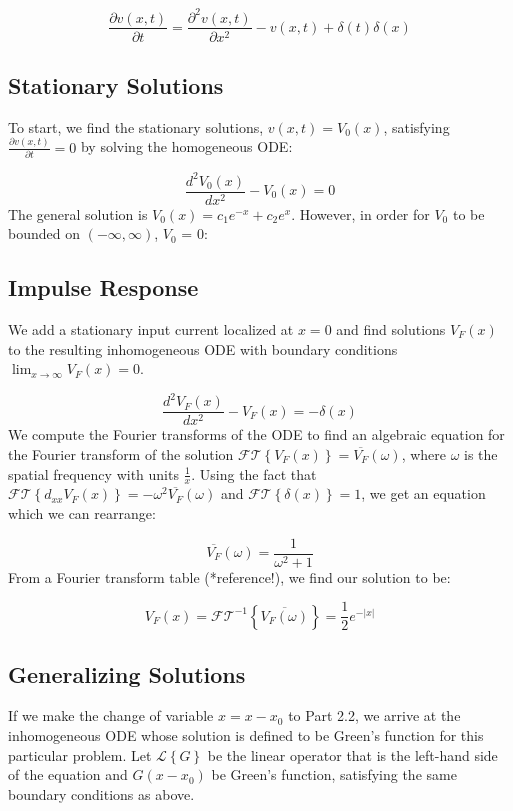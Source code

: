 \documentclass[12pt]{article}
\begin{document}
\begin{equation} \label{pm}
\frac{\partial{v(x,t)}}{\partial{t}}=\frac{\partial^2{v(x,t)}}{\partial{x}^2}-v(x,t)+\delta(t)\delta(x)
\end {equation}

\subsection{Stationary Solutions}
To start, we find the stationary solutions, $v(x,t) = V_0(x)$, satisfying $\frac{\partial{v(x,t)}}{\partial{t}} = 0$ by solving the homogeneous ODE:

\begin{equation} \label{pm_odeH}
\frac{d^2{V_0(x)}}{d{x^2}} - V_0(x) = 0
\end{equation}
The general solution is $V_0(x) = c_1e^{-x} + c_2e^{x}$. However, in order for $V_0$ to be bounded on $(-\infty, \infty)$, $V_0$ = 0:

\subsection{Impulse Response}
We add a stationary input current localized at $x=0$ and find solutions $V_F(x)$ to the resulting inhomogeneous ODE with boundary conditions $\lim_{x\to\infty} V_F(x) = 0$.

\begin{equation} \label{pm_odeN}
\frac{d^2{V_F(x)}}{d{x^2}} - V_F(x) = -\delta(x)
\end{equation}
We compute the Fourier transforms of the ODE to find an algebraic equation for the Fourier transform of the solution $\mathcal{FT}\left\{V_F(x)\right\} = \overline{V_F}(\omega)$, where $\omega$ is the spatial frequency with units $\frac{1}{x}$. Using the fact that $\mathcal{FT}\left\{d_{xx}V_F(x)\right\} = -\omega^2\overline{V_F}(\omega)$ and $ \mathcal{FT}\left\{\delta(x)\right\} = 1$, we get an equation which we can rearrange:

$$  \overline{V_F}(\omega) = \frac{1}{\omega^2+1} $$
From a Fourier transform table (*reference!), we find our solution to be:

$$ V_F(x) = \mathcal{FT}^{-1}\left\{\overline{V_F(\omega)}\right\} =  \frac{1}{2}e^{-|x|} $$

\subsection{Generalizing Solutions}
If we make the change of variable $x = x-x_0$ to Part 2.2, we arrive at the inhomogeneous ODE whose solution is defined to be Green's function for this particular problem. Let $\mathcal{L}\left\{G\right\}$ be the linear operator that is the left-hand side of the equation and $G(x-x_0)$ be Green's function, satisfying the same boundary conditions as above.
\end{document}
